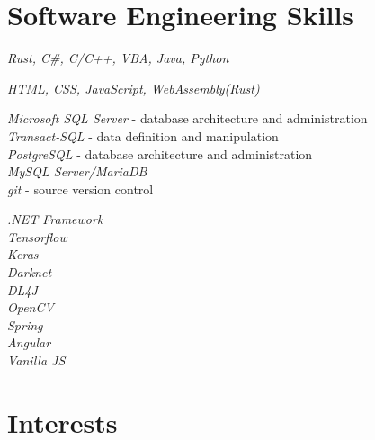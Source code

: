 \documentclass[10pt]{article} %
\begin{document}



\section{Software Engineering Skills}

{
\textit{Rust, C\#, C/C++, VBA, Java, Python}\\
}


{
\textit{HTML, CSS, JavaScript, WebAssembly(Rust)}\\
}


{
\textit{Microsoft SQL Server} - database architecture and administration\\
\textit{Transact-SQL} - data definition and manipulation\\
\textit{PostgreSQL} - database architecture and administration\\
\textit{MySQL Server/MariaDB}\\
\textit{git} - source version control
}


{
\textit{.NET Framework}\\
\textit{Tensorflow}\\
\textit{Keras}\\
\textit{Darknet}\\
\textit{DL4J}\\
\textit{OpenCV}\\
\textit{Spring}\\
\textit{Angular}\\
\textit{Vanilla JS}\\
}


\section{Interests}

\end{document}
